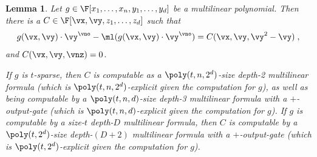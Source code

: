 \documentclass[11pt]{article}
\numberwithin{equation}{section}
\newtheorem{lemma}[theorem]{Lemma}
\theoremstyle{definition}
\theoremstyle{plain}
\begin{document}
\begin{lemma}\label{res:multilin:mon_formula}
        Let $g\in\F[x_1,\ldots,x_n,y_1,\ldots,y_d]$ be a multilinear polynomial. Then there is a $C\in\F[\vx,\vy,z_1,\ldots,z_d]$ such that
        \[
                g(\vx,\vy)\cdot \vy^\vno-\ml(g(\vx,\vy)\cdot \vy^\vno)
                =C(\vx,\vy,\vy^2-\vy)
                \;,
        \]
        and $C(\vx,\vy,\vnz)=0$.

        If $g$ is $t$-sparse, then $C$ is computable as a $\poly(t,n,2^d)$-size depth-2 multilinear formula (which is $\poly(t,n,2^d)$-explicit given the computation for $g$), as well as being computable by a $\poly(t,n,d)$-size depth-3 multilinear formula with a $+$-output-gate (which is $\poly(t,n,d)$-explicit given the computation for $g$).  If $g$ is computable by a size-$t$ depth-$D$ multilinear formula, then $C$ is computable by a $\poly(t,2^d)$-size depth-$(D+2)$ multilinear formula with a $+$-output-gate (which is $\poly(t,2^d)$-explicit given the computation for $g$).
\end{lemma}
\end{document}
